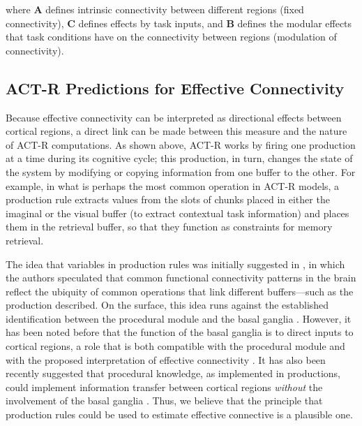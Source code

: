 \documentclass[10pt,letterpaper]{article}
\newcommand{\mat}[1]{\boldsymbol{#1}} %
\begin{document}
where $\mat{A}$ defines intrinsic connectivity between different regions (fixed connectivity), $\mat{C}$ defines effects by task inputs, and $\mat{B}$ defines the modular effects that task conditions have on the connectivity between regions (modulation of connectivity). %



\subsection{ACT-R Predictions for Effective Connectivity }

Because effective connectivity can be interpreted as directional effects between cortical regions, a direct link can be made between this measure and the nature of ACT-R computations. As shown above, ACT-R works by firing one production at a time during its cognitive cycle; this production, in turn, changes the state of the system by modifying or copying information from one buffer to the other. For example, in what is perhaps the most common operation in ACT-R models, a production rule extracts values from the slots of chunks placed in either the imaginal or the visual buffer (to extract contextual task information) and places them in the retrieval buffer, so that they function as constraints for memory retrieval.  

The idea that variables in production rules was initially suggested in , in which the authors speculated that common functional connectivity patterns in the brain reflect the ubiquity of common operations that link different buffers---such as the production described. On the surface, this idea runs against the established identification between the procedural module and the basal ganglia \cite{Anderson2004,anderson2009can}. However, it has been noted before that the function of the basal ganglia is to direct inputs to cortical regions, a role that is both compatible with the procedural module and with the proposed interpretation of effective connectivity \cite{stocco2010conditional}. It has also been recently suggested that procedural knowledge, as implemented in productions, could implement information transfer between cortical regions {\it without} the involvement of the basal ganglia \cite{rice2019role}. Thus, we believe that the principle that production rules could be used to estimate effective connective is a plausible one.
\end{document}
